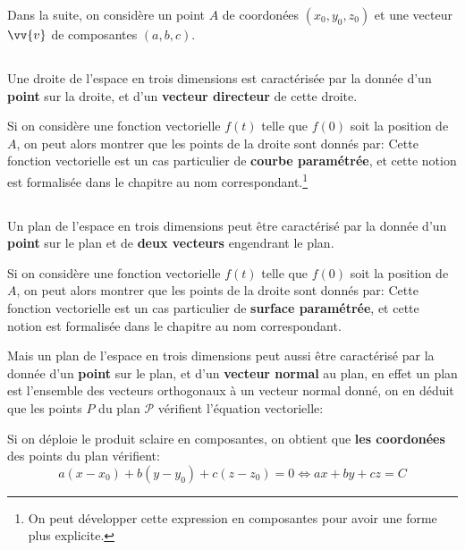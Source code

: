 Dans la suite, on considère un point \(A\) de coordonées \((x_0, y_0, z_0)\) et une vecteur \(\vv{v}\) de composantes \((a, b, c)\).

\subsection*{}
Une droite de l'espace en trois dimensions est caractérisée par la donnée d'un \textbf{point} sur la droite, et d'un \textbf{vecteur directeur} de cette droite.\<

Si on considère une fonction vectorielle \(f(t)\) telle que \(f(0)\) soit la position de \(A\), on peut alors montrer que les points de la droite sont donnés par:
Cette fonction vectorielle est un cas particulier de \textbf{courbe paramétrée}, et cette notion est formalisée dans le chapitre au nom correspondant.\footnote[1]{On peut développer cette expression en composantes pour avoir une forme plus explicite.\label{developpement}} 

\subsection*{}
Un plan de l'espace en trois dimensions peut être caractérisé par la donnée d'un \textbf{point} sur le plan et de \textbf{deux vecteurs} engendrant le plan.\<

Si on considère une fonction vectorielle \(f(t)\) telle que \(f(0)\) soit la position de \(A\), on peut alors montrer que les points de la droite sont donnés par:
Cette fonction vectorielle est un cas particulier de \textbf{surface paramétrée}, et cette notion est formalisée dans le chapitre au nom correspondant.\<

Mais un plan de l'espace en trois dimensions peut aussi être caractérisé par la donnée d'un \textbf{point} sur le plan, et d'un \textbf{vecteur normal} au plan, en effet un plan est l'ensemble des vecteurs orthogonaux à un vecteur normal donné, on en déduit que les points \(P\) du plan \(\mathscr{P}\) vérifient l'équation vectorielle:

Si on déploie le produit sclaire en composantes, on obtient que \textbf{les coordonées} des points du plan vérifient:
\[
   a(x - x_0) + b(y - y_0) + c(z - z_0) = 0 \Longleftrightarrow ax + by + cz = C
\]

